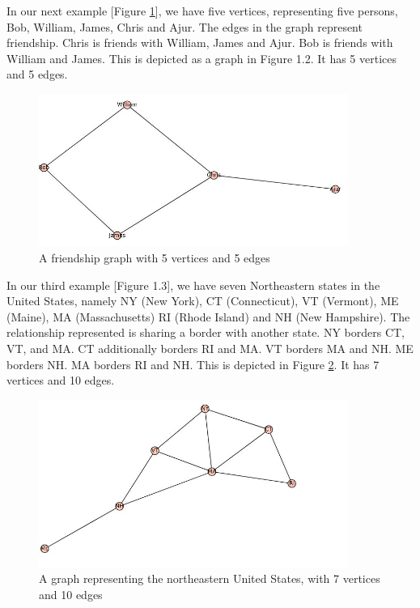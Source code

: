 In our next example [Figure \ref{1g2}], we have five vertices, representing five persons, Bob, William, James, Chris and Ajur. The edges in the graph represent friendship. Chris is friends with William, James and Ajur. Bob is friends with William and James. This is depicted as a graph in Figure 1.2. It has 5 vertices and 5 edges.
\begin{figure}
\begin{center}
\includegraphics[width=0.9\textwidth]{example2.JPG}
\caption{A friendship graph with 5 vertices and 5 edges}\label{1g2}
\end{center}
\end{figure}
\begin{newpage}
\end{newpage}
In our third example [Figure 1.3], we have seven Northeastern states in the United States, namely NY (New York), CT (Connecticut), VT (Vermont), ME (Maine), MA (Massachusetts) RI (Rhode Island) and NH (New Hampshire). The relationship represented is sharing a border with another state. NY borders CT, VT, and MA. CT additionally borders RI and MA. VT borders MA and NH. ME borders NH. MA borders RI and NH. This is depicted in Figure \ref{1g3}. It has 7 vertices and 10 edges.

\begin{figure}
\begin{center}
\includegraphics[width=0.9\textwidth]{example3.JPG}
\caption{A graph representing the northeastern United States, with 7 vertices and 10 edges}\label{1g3}
\end{center}
\end{figure}
\begin{newpage}
\end{newpage}

